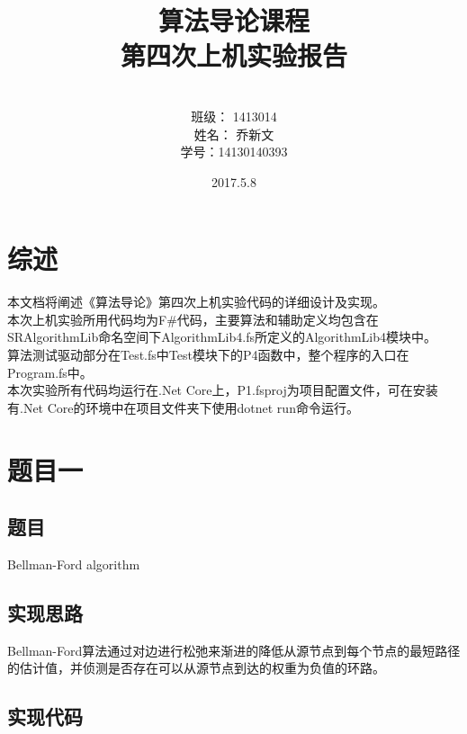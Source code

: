 \documentclass[a4paper]{article}
\begin{document}
\title{\Huge 算法导论课程\\ 第四次上机实验报告}
\author { \vspace{12cm} \\ \LARGE 班级：  1413014  \\ \LARGE 姓名：  乔新文   \\ \LARGE 学号：14130140393} 
\date{ \vspace{4cm} 2017.5.8}

\maketitle
\clearpage

\tableofcontents

\clearpage

\section{综述}

本文档将阐述《算法导论》第四次上机实验代码的详细设计及实现。\\

本次上机实验所用代码均为F\#代码，主要算法和辅助定义均包含在SRAlgorithmLib命名空间下AlgorithmLib4.fs所定义的AlgorithmLib4模块中。\\

算法测试驱动部分在Test.fs中Test模块下的P4函数中，整个程序的入口在Program.fs中。\\

本次实验所有代码均运行在.Net Core上，P1.fsproj为项目配置文件，可在安装有.Net Core的环境中在项目文件夹下使用dotnet run命令运行。\\

\section{题目一}

\subsection{题目}

Bellman-Ford algorithm 

\subsection{实现思路}
Bellman-Ford算法通过对边进行松弛来渐进的降低从源节点到每个节点的最短路径的估计值，并侦测是否存在可以从源节点到达的权重为负值的环路。
\subsection{实现代码}
\end{document}
